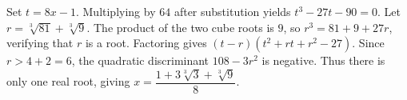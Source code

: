 Set $ t=8x-1 $. Multiplying by $ 64 $ after substitution yields $ t^3-27t-90=0 $. Let $ r=\sqrt[3]{81}+\sqrt[3]9 $. The product of the two cube roots is $ 9 $, so $ r^3=81+9+27r $, verifying that $ r $ is a root. Factoring gives $(t-r)(t^2+rt+r^2-27)$. Since $ r>4+2=6 $, the quadratic discriminant $ 108-3r^2 $ is negative. Thus there is only one real root, giving $\boxed{x=\dfrac{1+3\sqrt[3]3+\sqrt[3]9}{8}}$.
